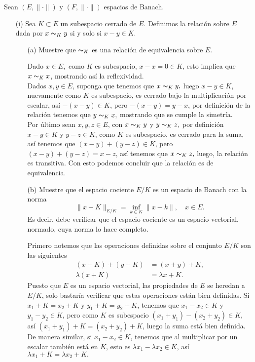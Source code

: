 Sean $(E,\|\cdot\|)$ y $(F,\|\cdot\|)$ espacios de Banach.
\begin{itemize}
    \item[(i)] Sea $K\subset E$ un subespacio cerrado de $E.$ Definimos la relación sobre $E$ dada por $x\thicksim_Ky$ si y solo si $x-y\in K.$
    \begin{itemize}
        \item[(a)] Muestre que $\thicksim_K$ es una relación de equivalencia sobre $E.$\\
        \begin{sproof}
            Dado $x\in E,$ como $K$ es subespacio, $x-x=0\in K$, esto implica que $x\thicksim_K x$, mostrando así la reflexividad.\\

            Dados $x,y\in E$, suponga que tenemos que $x\thicksim_K y,$ luego $x-y\in K$, nuevamente como $K$ es subespacio, es cerrado bajo la multiplicación por escalar, así $-(x-y)\in K$, pero $-(x-y)=y-x$, por definición de la relación tenemos que $y\thicksim_K x,$ mostrando que se cumple la simetría.\\

            Por último sean $x,y,z\in E$, con $x\thicksim_K y$ y $y\thicksim_K z,$ por definición $x-y\in K$ y $y-z\in K$, como $K$ es subespacio, es cerrado para la suma, así tenemos que $(x-y)+(y-z)\in K$, pero $(x-y)+(y-z)=x-z$, así tenemos que $x\thicksim_K z,$ luego, la relación es transitiva. Con esto podemos concluir que la relación es de equivalencia. 

        \end{sproof}
        \item[(b)] Muestre que el espacio cociente $E/K$ es un espacio de Banach con la norma
        $$\|x+K\|_{E/K}=\inf_{k\in K}\|x-k\|,\quad x\in E.$$ 
        Es decir, debe verificar que el espacio cociente es un espacio vectorial, normado, cuya norma lo hace completo.
        \begin{sproof}
            Primero notemos que las operaciones definidas sobre el conjunto $E/K$ son las siguientes
            \begin{align*}
                (x+K)+(y+K)&=(x+y)+K,\\
                \lambda(x+K)&=\lambda x+K.
            \end{align*}
            Puesto que $E$ es un espacio vectorial, las propiedades de $E$ se heredan a $E/K$, solo bastaría verificar que estas operaciones están bien definidas. Si $x_1+K=x_2+K$ y $y_1+K=y_2+K$, tenemos que $x_1-x_2\in K$ y $y_1-y_2\in K$, pero como $K$ es subespacio  $(x_1+y_1)-(x_2+y_2)\in K$, así $(x_1+y_1)+K=(x_2+y_2)+ K$, luego la suma está bien definida. De manera similar, si $x_1-x_2\in K$, tenemos que al multiplicar por un escalar también está en $K$, esto es $\lambda x_1-\lambda x_2\in K$, así $\lambda x_1+K=\lambda x_2+K.$\\


\end{sproof}
\end{itemize}
\end{itemize}
